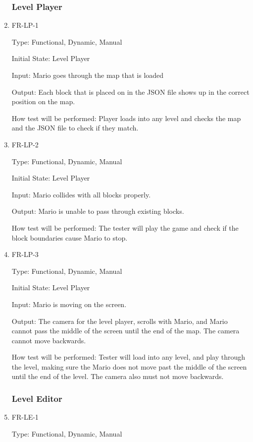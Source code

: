 \documentclass[12pt, titlepage]{article}
\begin{document}
\begin{enumerate}
\subsubsection{Level Player}

\item{FR-LP-1}

Type: Functional, Dynamic, Manual

Initial State: Level Player

Input: Mario goes through the map that is loaded

Output: Each block that is placed on in the JSON file shows up in the correct position on the map.

How test will be performed: Player loads into any level and checks the map and the JSON file to check if they match.


\item{FR-LP-2}

Type: Functional, Dynamic, Manual

Initial State: Level Player

Input: Mario collides with all blocks properly.

Output: Mario is unable to pass through existing blocks.

How test will be performed: The tester will play the game and check if the block boundaries cause Mario to stop.

\item{FR-LP-3}

Type: Functional, Dynamic, Manual

Initial State: Level Player

Input: Mario is moving on the screen.

Output: The camera for the level player, scrolls with Mario, and Mario cannot pass the middle of the screen until the end of the map. The camera cannot move backwards.

How test will be performed: Tester will load into any level, and play through the level, making sure the Mario does not move past the middle of the screen until the end of the level. The camera also must not move backwards.


\subsubsection{Level Editor}

\item{FR-LE-1}

Type: Functional, Dynamic, Manual


\end{enumerate}
\end{document}
